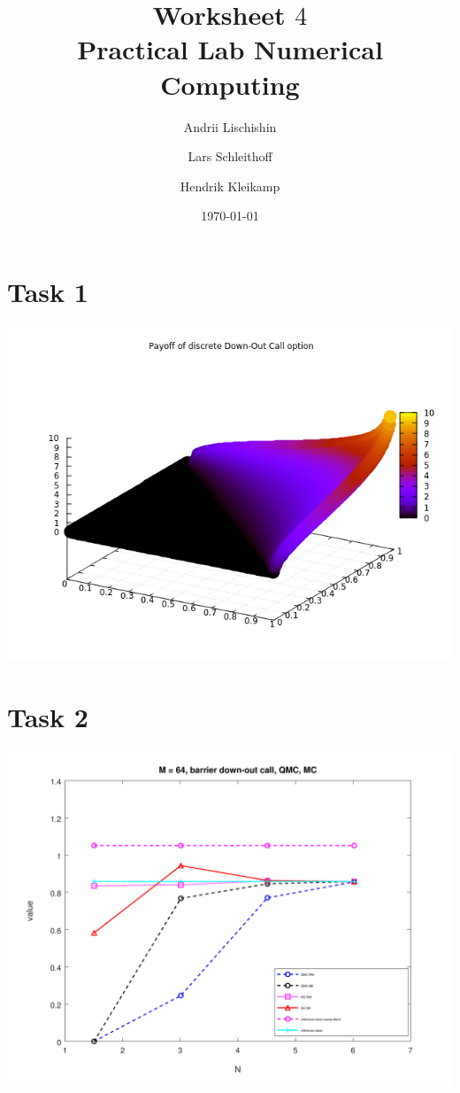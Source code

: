 \documentclass[10pt,a4paper]{article}
\begin{document}
\title{Worksheet $4$\\
\small{Practical Lab Numerical Computing}}
\author{Andrii Lischishin \and Lars Schleithoff \and Hendrik Kleikamp}
\date{\today}
\maketitle

\section*{Task 1}

\begin{center}
	\includegraphics[scale=0.7]{payoff_down_out_call.png}
\end{center}

\section*{Task 2}


\begin{center}
	\includegraphics[scale=0.35]{images/task2.png}
\end{center}
\end{document}
